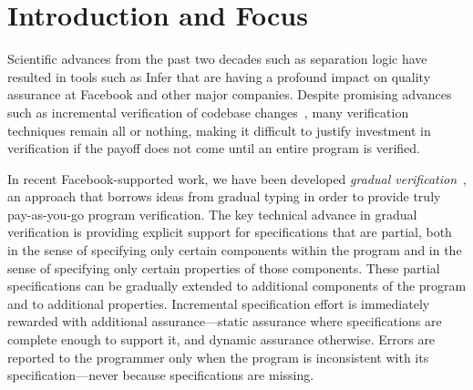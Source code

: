 \documentclass[12pt,twocolumn]{article}
\begin{document}
\begin{sloppypar}

\twocolumn[
\begin{center}
\Large
\textbf{Gradual Verification in Practice}

\vspace{0.5cm}

\normalsize
\textbf{Jonathan Aldrich
(\href{https://dblp.uni-trier.de/pers/hd/a/Aldrich:Jonathan}{DBLP}
/\href{https://scholar.google.com/citations?user=AzHmOtcAAAAJ&hl=en}{GS}),
%
\'Eric Tanter (\href{https://dblp.uni-trier.de/pers/hd/t/Tanter:=Eacute=ric}{DBLP}/\href{https://scholar.google.com/citations?user=d0LISE4AAAAJ}{GS}), \\
%
Joshua Sunshine 
(\href{https://dblp.uni-trier.de/pers/hd/s/Sunshine:Joshua}{DBLP}
/\href{https://scholar.google.com/citations?user=V1texCUAAAAJ&hl=en&oi=ao}{GS}),
%
and Johannes Bader (\href{https://dblp.uni-trier.de/pers/hd/b/Bader:Johannes}{DBLP}
)
}

\vspace{0.5cm}

\end{center}]


\section{Introduction and Focus}
\vspace{-2ex}

Scientific advances from the past two decades such as separation logic have resulted in tools such as Infer that are having a profound impact on quality assurance at Facebook and other major companies.  Despite promising advances such as incremental verification of codebase changes~\cite{StartupsScaleups}, many verification techniques remain all or nothing, making it difficult to justify investment in verification if the payoff does not come until an entire program is verified.

In recent Facebook-supported work, we have been developed \textit{gradual verification}~\cite{baderAl:vmcai2018}, an approach that borrows ideas from gradual typing in order to provide truly pay-as-you-go program verification.  The key technical advance in gradual verification is providing explicit support for specifications that are partial, both in the sense of specifying only certain components within the program and in the sense of specifying only certain properties of those components.  These partial specifications can be gradually extended to additional components of the program and to additional properties.  Incremental specification effort is immediately rewarded with additional assurance---static assurance where specifications are complete enough to support it, and dynamic assurance otherwise.  Errors are reported to the programmer only when the program is inconsistent with its specification---never because specifications are missing.


\end{sloppypar}
\end{document}
